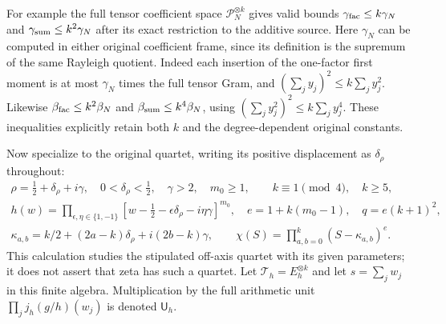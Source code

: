 For example the full tensor coefficient space
$\mathcal P_N^{\otimes k}$ gives valid bounds
$\gamma_{\rm fac}\leq k\gamma_N$ and
$\gamma_{\rm sum}\leq k^2\gamma_N$ after its exact restriction to
the additive source.  Here $\gamma_N$ can be computed in either
original coefficient frame, since its definition is the supremum
of the same Rayleigh quotient.  Indeed each insertion of the
one-factor first moment is at most $\gamma_N$ times the full tensor
Gram, and $(\sum_jy_j)^2\leq k\sum_jy_j^2$.  Likewise
$\beta_{\rm fac}\leq k^2\beta_N$ and
$\beta_{\rm sum}\leq k^4\beta_N$, using
$(\sum_jy_j^2)^2\leq k\sum_jy_j^4$.  These inequalities explicitly
retain both $k$ and the degree-dependent original constants.

Now specialize to the original quartet, writing its positive
displacement as $\delta_\rho$ throughout:
\begin{equation}\tag{GM23}
 \begin{gathered}
 \rho=\tfrac12+\delta_\rho+i\gamma,\quad
 0<\delta_\rho<\tfrac12,\quad\gamma>2,\quad m_0\geq1,\qquad
 k\equiv1\pmod4,\quad k\geq5,\\
 h(w)=\prod_{\epsilon,\eta\in\{1,-1\}}
       [w-\tfrac12-\epsilon\delta_\rho-i\eta\gamma]^{m_0},
 \quad e=1+k(m_0-1),\quad q=e(k+1)^2,\\
 \kappa_{a,b}=k/2+(2a-k)\delta_\rho+i(2b-k)\gamma,\qquad
 \chi(S)=\prod_{a,b=0}^k(S-\kappa_{a,b})^e.
 \end{gathered}
\end{equation}
This calculation studies the stipulated off-axis quartet with its
given parameters; it does not assert that zeta has such a quartet.
Let $\mathcal T_h=E_h^{\otimes k}$ and let $s=\sum_jw_j$ in this
finite algebra.  Multiplication by the full arithmetic unit
$\prod_j j_h(g/h)(w_j)$ is denoted $\mathsf U_h$.

